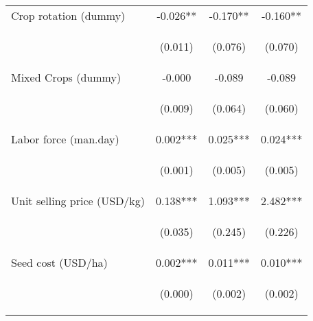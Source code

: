 \begin{center}
\begin{tabular}{lccc}
Crop rotation (dummy) & -0.026** & -0.170** & -0.160** \\
\vspace{4pt} & \begin{footnotesize}(0.011)\end{footnotesize} & \begin{footnotesize}(0.076)\end{footnotesize} & \begin{footnotesize}(0.070)\end{footnotesize} \\
Mixed Crops (dummy) & -0.000 & -0.089 & -0.089 \\
\vspace{4pt} & \begin{footnotesize}(0.009)\end{footnotesize} & \begin{footnotesize}(0.064)\end{footnotesize} & \begin{footnotesize}(0.060)\end{footnotesize} \\
Labor force (man.day) & 0.002*** & 0.025*** & 0.024*** \\
\vspace{4pt} & \begin{footnotesize}(0.001)\end{footnotesize} & \begin{footnotesize}(0.005)\end{footnotesize} & \begin{footnotesize}(0.005)\end{footnotesize} \\
Unit selling price (USD/kg) & 0.138*** & 1.093*** & 2.482*** \\
\vspace{4pt} & \begin{footnotesize}(0.035)\end{footnotesize} & \begin{footnotesize}(0.245)\end{footnotesize} & \begin{footnotesize}(0.226)\end{footnotesize} \\
Seed cost (USD/ha) & 0.002*** & 0.011*** & 0.010*** \\
\vspace{4pt} & \begin{footnotesize}(0.000)\end{footnotesize} & \begin{footnotesize}(0.002)\end{footnotesize} & \begin{footnotesize}(0.002)\end{footnotesize} \\

\end{tabular}
\end{center}

